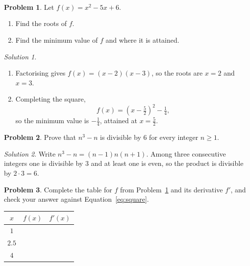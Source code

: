 \documentclass[11pt, a4paper]{article}
\title{\assignmentname \\[0.3em] \large \coursename}
\author{\studentname \\ \small \studentid}
\date{\duedate}
\theoremstyle{definition}
\newtheorem{problem}{Problem}
\theoremstyle{remark}
\newtheorem*{solution}{Solution}
\begin{document}
\maketitle
\thispagestyle{fancy}

\begin{problem}
\label{prob:quadratic}
Let $f(x) = x^2 - 5x + 6$.
\begin{enumerate}
  \item Find the roots of $f$.
  \item Find the minimum value of $f$ and where it is attained.
\end{enumerate}
\end{problem}

\begin{solution}
\begin{enumerate}
  \item Factorising gives $f(x) = (x - 2)(x - 3)$, so the roots are
  $x = 2$ and $x = 3$.
  \item Completing the square,
  \begin{equation}
    f(x) = \left(x - \tfrac{5}{2}\right)^2 - \tfrac{1}{4} ,
    \label{eq:square}
  \end{equation}
  so the minimum value is $-\tfrac{1}{4}$, attained at $x = \tfrac{5}{2}$.
\end{enumerate}
\end{solution}

\begin{problem}
\label{prob:divisible}
Prove that $n^3 - n$ is divisible by $6$ for every integer $n \geq 1$.
\end{problem}

\begin{solution}
Write $n^3 - n = (n - 1) n (n + 1)$. Among three consecutive integers one
is divisible by $3$ and at least one is even, so the product is divisible
by $2 \cdot 3 = 6$.
\end{solution}

\begin{problem}
\label{prob:table}
Complete the table for $f$ from Problem~\ref{prob:quadratic} and its
derivative $f'$, and check your answer against Equation~\eqref{eq:square}.
\begin{center}
  \begin{tabular}{crr}
    \toprule
    $x$ & $f(x)$ & $f'(x)$ \\
    \midrule
    $1$ & & \\
    $2.5$ & & \\
    $4$ & & \\
    \bottomrule
  \end{tabular}
\end{center}
\end{problem}
\end{document}
